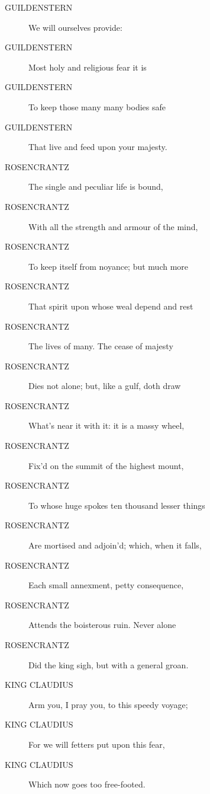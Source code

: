 \documentclass{article}
\begin{document}
\begin{description}
            
\item[GUILDENSTERN] We will ourselves provide:
\item[GUILDENSTERN] Most holy and religious fear it is
\item[GUILDENSTERN] To keep those many many bodies safe
\item[GUILDENSTERN] That live and feed upon your majesty.
\end{description}
          
\begin{description}
            
\item[ROSENCRANTZ] The single and peculiar life is bound,
\item[ROSENCRANTZ] With all the strength and armour of the mind,
\item[ROSENCRANTZ] To keep itself from noyance; but much more
\item[ROSENCRANTZ] That spirit upon whose weal depend and rest
\item[ROSENCRANTZ] The lives of many. The cease of majesty
\item[ROSENCRANTZ] Dies not alone; but, like a gulf, doth draw
\item[ROSENCRANTZ] What's near it with it: it is a massy wheel,
\item[ROSENCRANTZ] Fix'd on the summit of the highest mount,
\item[ROSENCRANTZ] To whose huge spokes ten thousand lesser things
\item[ROSENCRANTZ] Are mortised and adjoin'd; which, when it falls,
\item[ROSENCRANTZ] Each small annexment, petty consequence,
\item[ROSENCRANTZ] Attends the boisterous ruin. Never alone
\item[ROSENCRANTZ] Did the king sigh, but with a general groan.
\end{description}
          
\begin{description}
            
\item[KING CLAUDIUS] Arm you, I pray you, to this speedy voyage;
\item[KING CLAUDIUS] For we will fetters put upon this fear,
\item[KING CLAUDIUS] Which now goes too free-footed.
\end{description}
          
\end{document}
